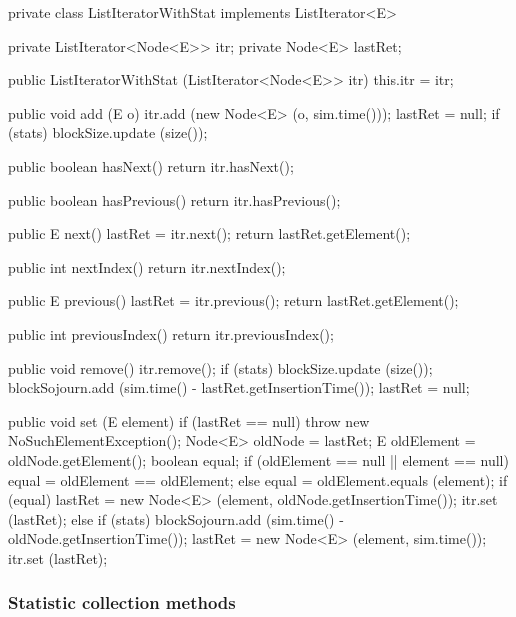 \begin{code}
\begin{hide}
   private class ListIteratorWithStat implements ListIterator<E> {
      private ListIterator<Node<E>> itr;
      private Node<E> lastRet;

      public ListIteratorWithStat (ListIterator<Node<E>> itr) {
         this.itr = itr;
      }

      public void add (E o) {
         itr.add (new Node<E> (o, sim.time()));
         lastRet = null;
         if (stats)
            blockSize.update (size());
      }

      public boolean hasNext() {
         return itr.hasNext();
      }

      public boolean hasPrevious() {
         return itr.hasPrevious();
      }

      public E next() {
         lastRet = itr.next();
         return lastRet.getElement();
      }

      public int nextIndex() {
         return itr.nextIndex();
      }

      public E previous() {
         lastRet = itr.previous();
         return lastRet.getElement();
      }

      public int previousIndex() {
         return itr.previousIndex();
      }

      public void remove() {
         itr.remove();
         if (stats) {
            blockSize.update (size());
            blockSojourn.add (sim.time() - lastRet.getInsertionTime());
         }
         lastRet = null;
      }

      public void set (E element) {
         if (lastRet == null)
            throw new NoSuchElementException();
         Node<E> oldNode = lastRet;
         E oldElement = oldNode.getElement();
         boolean equal;
         if (oldElement == null || element == null)
            equal = oldElement == oldElement;
         else
            equal = oldElement.equals (element);
         if (equal) {
            lastRet = new Node<E> (element, oldNode.getInsertionTime());
            itr.set (lastRet);
         }
         else {
            if (stats)
               blockSojourn.add (sim.time() - oldNode.getInsertionTime());
            lastRet = new Node<E> (element, sim.time());
            itr.set (lastRet);
         }
      }
   }
\end{hide}
\end{code}

\subsubsection* {Statistic collection methods}

